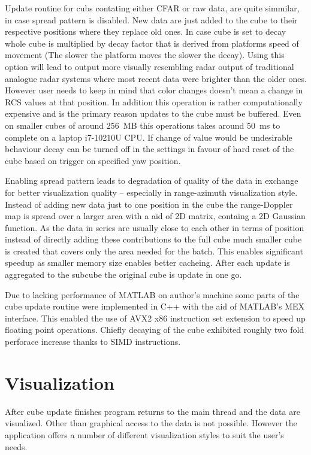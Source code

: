 Update routine for cubs contating either CFAR or raw data, are quite simmilar, in case spread pattern is disabled.
New data are just added to the cube to their respective positions where they replace old ones.
In case cube is set to decay whole cube is multiplied by decay factor that is derived from platforms speed of movement (The slower the platform moves the slower the decay).
Using this option will lead to output more visually resembling radar output of traditional analogue radar systems where most recent data were brighter than the older ones.
However user needs to keep in mind that color changes doesn't mean a change in RCS values at that position.
In addition this operation is rather computationally expensive and is the primary reason updates to the cube must be buffered.
Even on smaller cubes of around 256~MB this operations takes around 50~ms to complete on a laptop i7-10210U CPU.
If change of value would be undesirable behaviour decay can be turned off in the settings in favour of hard reset of the cube based on trigger on specified yaw position.

Enabling spread pattern leads to degradation of quality of the data in exchange for better visualization quality -- especially in range-azimuth visualization style.
Instead of adding new data just to one position in the cube the range-Doppler map is spread over a larger area with a aid of 2D matrix, containg a 2D Gaussian function.
As the data in series are usually close to each other in terms of position instead of directly adding these contributions to the full cube much smaller cube is created that covers only the area needed for the batch.
This enables significant speedup as smaller memory size enables better cacheing.
After each update is aggregated to the subcube the original cube is update in one go.

Due to lacking performance of MATLAB on author's machine some parts of the cube update routine were implemented in C++ with the aid of MATLAB's MEX interface.
This enabled the use of AVX2 x86 instruction set extension to speed up floating point operations.
Chiefly decaying of the cube exhibited roughly two fold perforace increase thanks to SIMD instructions.


\section{Visualization}

After cube update finishes program returns to the main thread and the data are visualized.
Other than graphical access to the data is not possible.
However the application offers a number of different visualization styles to suit the user's needs.


